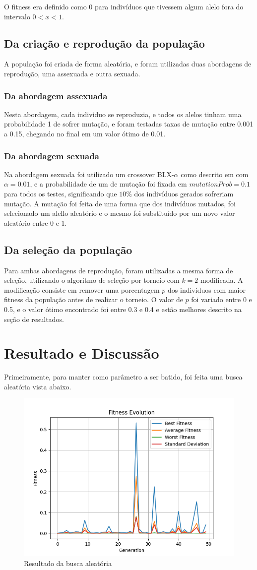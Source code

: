 \documentclass[12pt]{article}
\begin{document}
O fitness era definido como 0 para indivíduos que tivessem algum alelo fora do intervalo \(0<x<1\).
\subsection{Da criação e reprodução da população}
A população foi criada de forma aleatória, e foram utilizadas duas abordagens de reprodução, uma assexuada e outra sexuada.
\subsubsection{Da abordagem assexuada}
Nesta abordagem, cada individuo se reproduzia, e todos os alelos tinham uma probabilidade 1 de sofrer mutação, e foram testadas taxas de mutação entre 0.001 a 0.15, chegando no final em um valor ótimo de 0.01.
\subsubsection{Da abordagem sexuada}
Na abordagem sexuada foi utilizado um crossover BLX-$\alpha$  como descrito em \cite{de2002tutorial} com $\alpha=0.01$, e a probabilidade de um  de mutação foi fixada em $mutationProb=0.1$ para todos os testes, significando que $10\%$ dos indivíduos gerados sofreriam mutação. A mutação foi feita de uma forma que dos indivíduos mutados, foi selecionado um alello aleatório e o mesmo foi substituído por um novo valor aleatório entre 0 e 1.

\subsection{Da seleção da população}

Para ambas abordagens de reprodução, foram utilizadas a mesma forma de seleção, utilizando o algoritmo de seleção por torneio com \(k=2\) modificada. A modificação consiste em remover uma porcentagem \(p\) dos indivíduos com maior fitness da população antes de realizar o torneio. O valor de \(p\) foi variado entre 0 e 0.5, e o valor ótimo encontrado foi entre 0.3 e 0.4 e estão melhores descrito na seção de resultados.
\section{Resultado e Discussão}

Primeiramente, para manter como parâmetro a ser batido, foi feita uma busca aleatória vista abaixo.

\begin{figure}[h]
    \centering
    \includegraphics[width=0.5\linewidth]{figures/random_search.png}
    \caption{Resultado da busca aleatória}
    \label{fig:random-search}
\end{figure}
\end{document}
